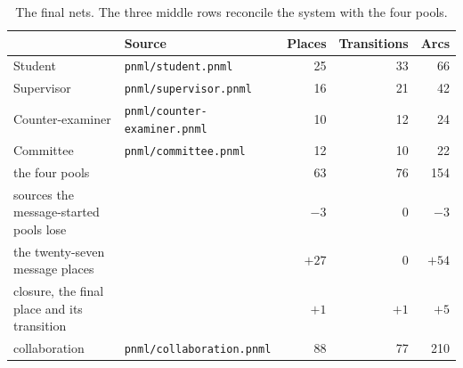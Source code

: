 \begin{table}[h]
  \centering
  \renewcommand{\arraystretch}{1.08}
  \begin{tabular}{@{}l l r r r@{}}
    \toprule
    & \textbf{Source} & \textbf{Places} & \textbf{Transitions} & \textbf{Arcs} \\
    \midrule
    Student          & \texttt{pnml/student.pnml}          & 25  & 33  & 66  \\
    Supervisor       & \texttt{pnml/supervisor.pnml}       & 16  & 21  & 42  \\
    Counter-examiner & \texttt{pnml/counter-examiner.pnml} & 10  & 12  & 24  \\
    Committee        & \texttt{pnml/committee.pnml}        & 12  & 10  & 22  \\
    \midrule
    the four pools   &                                     & 63  & 76  & 154 \\
    \midrule
    sources the message-started pools lose & & $-3$  & $0$   & $-3$ \\
    the twenty-seven message places        & & $+27$ & $0$   & $+54$ \\
    closure, the final place and its transition & & $+1$  & $+1$  & $+5$ \\
    \midrule
    collaboration    & \texttt{pnml/collaboration.pnml}    & 88  & 77  & 210 \\
    \bottomrule
  \end{tabular}
  \caption{The final nets. The three middle rows
    reconcile the system with the four pools.}
  \label{tab:consistency}
\end{table}
\vfill